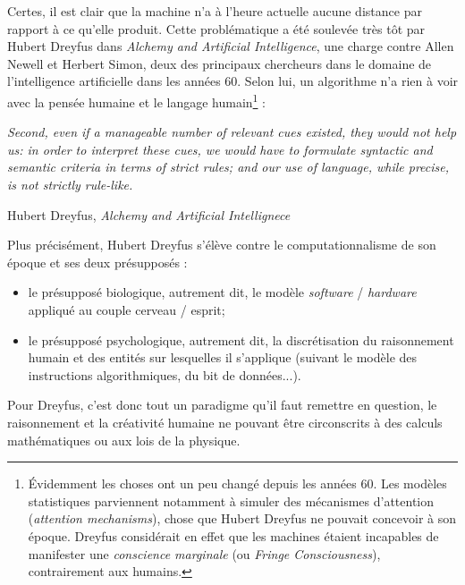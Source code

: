 \documentclass{article}
\newenvironment{citationbox}
{\begin{center}
		\begin{minipage}{.8\textwidth}
		}
		{
		\end{minipage}	
\end{center}
}
\begin{document}
				Certes, il est clair que la machine n'a à l'heure actuelle aucune distance par rapport à ce qu'elle produit. Cette problématique a été soulevée très tôt par Hubert Dreyfus dans \textit{Alchemy and Artificial Intelligence}, une charge contre Allen Newell et Herbert Simon, deux des principaux chercheurs dans le domaine de l’intelligence artificielle dans les années 60. Selon lui, un algorithme n'a rien à voir avec la pensée humaine et le langage humain\footnote{Évidemment les choses ont un peu changé depuis les années 60. Les modèles statistiques parviennent notamment à simuler des mécanismes d'attention (\textit{attention mechanisms}), chose que Hubert Dreyfus ne pouvait concevoir à son époque. Dreyfus considérait en effet que les machines étaient incapables de manifester une \textit{conscience marginale} (ou \textit{Fringe Consciousness}), contrairement aux humains.} :
				\begin{citationbox}
					\textit{Second, even if a manageable number of relevant cues existed, they would not help us: in order to interpret these cues, we would have to formulate syntactic and semantic criteria in terms of strict rules; and our use of language, while precise, is not strictly rule-like.}
					\begin{flushright}
						Hubert Dreyfus, \textit{Alchemy and Artificial Intellignece}\autocite[p.~33]{dreyfus1965}
					\end{flushright}
				\end{citationbox}
				Plus précisément, Hubert Dreyfus s'élève contre le computationnalisme de son époque et ses deux présupposés :
				\begin{itemize}
					\item le présupposé biologique, autrement dit, le modèle \textit{software} / \textit{hardware} appliqué au couple cerveau / esprit;
					\item le présupposé psychologique, autrement dit, la discrétisation du raisonnement humain et des entités sur lesquelles il s'applique (suivant le modèle des instructions algorithmiques, du bit de données...).
				\end{itemize}
				
				Pour Dreyfus, c'est donc tout un paradigme qu'il faut remettre en question, le raisonnement et la créativité humaine ne pouvant être circonscrits à des calculs mathématiques ou aux lois de la physique.\\
				
\end{document}
